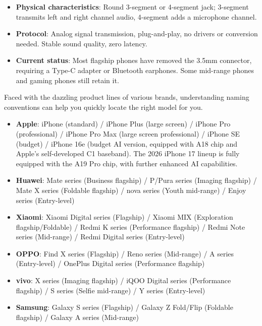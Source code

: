 
\begin{itemize}
  \item \textbf{Physical characteristics}: Round 3-segment or 4-segment jack; 3-segment transmits left and right channel audio, 4-segment adds a microphone channel.
  \item \textbf{Protocol}: Analog signal transmission, plug-and-play, no drivers or conversion needed. Stable sound quality, zero latency.
  \item \textbf{Current status}: Most flagship phones have removed the 3.5mm connector, requiring a Type-C adapter or Bluetooth earphones. Some mid-range phones and gaming phones still retain it.
\end{itemize}


Faced with the dazzling product lines of various brands, understanding naming conventions can help you quickly locate the right model for you.


\begin{itemize}
  \item \textbf{Apple}: iPhone (standard) / iPhone Plus (large screen) / iPhone Pro (professional) / iPhone Pro Max (large screen professional) / iPhone SE (budget) / iPhone 16e (budget AI version, equipped with A18 chip and Apple's self-developed C1 baseband). The 2026 iPhone 17 lineup is fully equipped with the A19 Pro chip, with further enhanced AI capabilities.
  \item \textbf{Huawei}: Mate series (Business flagship) / P/Pura series (Imaging flagship) / Mate X series (Foldable flagship) / nova series (Youth mid-range) / Enjoy series (Entry-level)
  \item \textbf{Xiaomi}: Xiaomi Digital series (Flagship) / Xiaomi MIX (Exploration flagship/Foldable) / Redmi K series (Performance flagship) / Redmi Note series (Mid-range) / Redmi Digital series (Entry-level)
  \item \textbf{OPPO}: Find X series (Flagship) / Reno series (Mid-range) / A series (Entry-level) / OnePlus Digital series (Performance flagship)
  \item \textbf{vivo}: X series (Imaging flagship) / iQOO Digital series (Performance flagship) / S series (Selfie mid-range) / Y series (Entry-level)
  \item \textbf{Samsung}: Galaxy S series (Flagship) / Galaxy Z Fold/Flip (Foldable flagship) / Galaxy A series (Mid-range)
\end{itemize}

